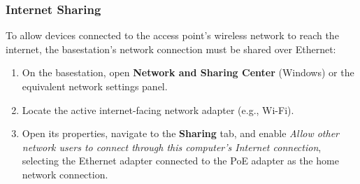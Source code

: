 \subsubsection{Internet Sharing}

To allow devices connected to the access point's wireless network to reach the internet, the basestation's network connection must be shared over Ethernet:

\begin{enumerate}
    \item On the basestation, open \textbf{Network and Sharing Center} (Windows) or the equivalent network settings panel.
    \item Locate the active internet-facing network adapter (e.g., Wi-Fi).
    \item Open its properties, navigate to the \textbf{Sharing} tab, and enable \textit{Allow other network users to connect through this computer's Internet connection}, selecting the Ethernet adapter connected to the PoE adapter as the home network connection.
\end{enumerate}



